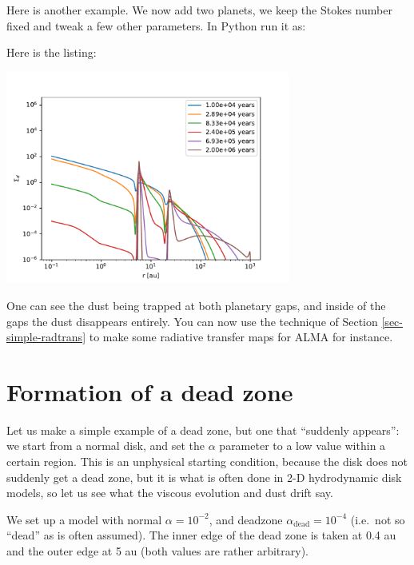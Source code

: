 \documentclass{book}
\begin{document}
Here is another example. We now add two planets, we keep the Stokes number fixed
and tweak a few other parameters. In Python run it as:
\begin{codebox}
\end{codebox}
Here is the listing:

\centerline{\includegraphics[width=0.7\textwidth]{../snippets/fig_snippet_planetgap_dustdrift_2_1.pdf}}
One can see the dust being trapped at both planetary gaps, and inside of the gaps
the dust disappears entirely. You can now use the technique of Section \ref{sec-simple-radtrans}
to make some radiative transfer maps for ALMA for instance.


\pagebreak
\section{Formation of a dead zone}
Let us make a simple example of a dead zone, but one that ``suddenly appears'':
we start from a normal disk, and set the $\alpha$ parameter to a low value within
a certain region. This is an unphysical starting condition, because the disk does
not suddenly get a dead zone, but it is what is often done in 2-D hydrodynamic disk
models, so let us see what the viscous evolution and dust drift say.

We set up a model with normal $\alpha=10^{-2}$, and deadzone
$\alpha_{\mathrm{dead}}=10^{-4}$ (i.e.\ not so ``dead'' as is often
assumed). The inner edge of the dead zone is taken at 0.4 au and the outer edge
at 5 au (both values are rather arbitrary).
\end{document}
